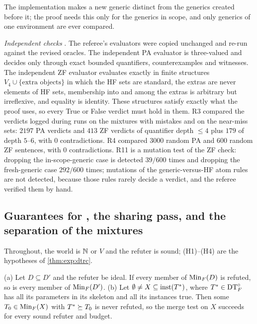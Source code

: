 The implementation makes a new generic distinct from the generics created before it; the proof needs this only for the generics in scope, and only generics of one environment are ever compared.

\emph{Independent checks} . The referee's evaluators were copied unchanged and re-run against the revised oracles. The independent PA evaluator is three-valued and decides only through exact bounded quantifiers, counterexamples and witnesses. The independent ZF evaluator evaluates exactly in finite structures $V_4\cup\{\text{extra objects}\}$ in which the HF sets are standard, the extras are never elements of HF sets, membership into and among the extras is arbitrary but irreflexive, and equality is identity. These structures satisfy exactly what the proof uses, so every True or False verdict must hold in them. R3 compared the verdicts logged during \DTRC{} runs on the mixtures with mistakes and on the near-miss sets: $2197$ PA verdicts and $413$ ZF verdicts of quantifier depth $\le4$ plus $179$ of depth $5$--$6$, with $0$ contradictions. R4 compared $3000$ random PA and $600$ random ZF sentences, with $0$ contradictions. R11 is a mutation test of the ZF check: dropping the in-scope-generic case is detected $39/600$ times and dropping the fresh-generic case $292/600$ times; mutations of the generic-versus-HF atom rules are not detected, because those rules rarely decide a verdict, and the referee verified them by hand.

\subsection{Guarantees for \texorpdfstring{\DTRC}{DTRC}, the sharing pass, and the separation of the mixtures}\label{app:exp:dtrc}

Throughout, the world is $\mathbb{N}$ or $V$ and the refuter is sound; (H1)--(H4) are the hypotheses of \cref{thm:exp:dtrc}.

\begin{proposition}\label{prop:exp:mono}
\textup{(a)} Let $D\subseteq D'$ and the refuter be ideal. If every member of $\mathrm{Min}_F(D)$ is refuted, so is every member of $\mathrm{Min}_F(D')$.
\textup{(b)} Let $\emptyset\neq X\subseteq\mathrm{inst}(T^*)$, where $T^*\in\mathrm{DT}^{\circ}_{F}$ has all its parameters in its skeleton and all its instances true. Then some $T_0\in\mathrm{Min}_F(X)$ with $T^*\succeq T_0$ is never refuted, so the merge test on $X$ succeeds for every sound refuter and budget.
\end{proposition}

